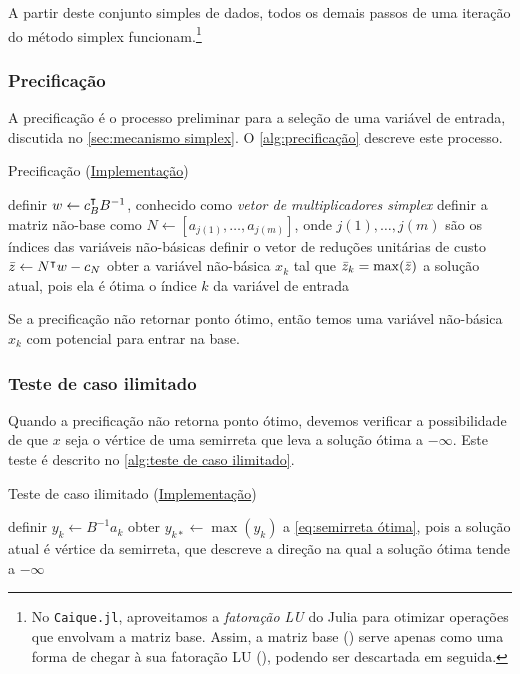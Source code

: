 A partir deste conjunto simples de dados, todos os demais passos de uma iteração do método simplex funcionam.\footnote{No \texttt{Caique.jl}, aproveitamos a \emph{fatoração LU} \cite{UFRGS:LU} do Julia para otimizar operações que envolvam a matriz base. Assim, a matriz base () serve apenas como uma forma de chegar à sua fatoração LU (), podendo ser descartada em seguida.}

\subsubsection*{Precificação}
A precificação é o processo preliminar para a seleção de uma variável de entrada, discutida no \cref{sec:mecanismo simplex}. O \cref{alg:precificação} descreve este processo.

\begin{algorithm}
\begin{algorithmic}[1]
    \caption{Precificação (\href{https://github.com/phcentenaro7/Caique.jl/blob/9c78027f1884181846a6321a5640f92c9a718ce4/src/Simplex.jl\#L88}{Implementação})}\label{alg:precificação}
    \State definir $ w \gets  c_B^\intercal B^{-1}$, conhecido como \emph{vetor de multiplicadores simplex}
    \State definir a matriz não-base como $ N \gets [a_{j(1)}, \ldots, a_{j(m)}]$, onde $j(1), \ldots, j(m)$ são os índices das variáveis não-básicas
    \State definir o vetor de reduções unitárias de custo $\bar{ z} \gets  N^\intercal w - c_N$
    \State obter a variável não-básica $ x_k$ tal que $\bar{z}_{k} = \max(\bar{ z})$
        \State \Return a solução atual, pois ela é ótima
    \EndIf
    \State \Return o índice $k$ da variável de entrada
\end{algorithmic}
\end{algorithm}

Se a precificação não retornar ponto ótimo, então temos uma variável não-básica $ x_k$ com potencial para entrar na base.

\subsubsection*{Teste de caso ilimitado}
Quando a precificação não retorna ponto ótimo, devemos verificar a possibilidade de que $ x$ seja o vértice de uma semirreta que leva a solução ótima a $-\infty$. Este teste é descrito no \cref{alg:teste de caso ilimitado}.

\begin{algorithm}
\begin{algorithmic}[1]
    \caption{Teste de caso ilimitado (\href{https://github.com/phcentenaro7/Caique.jl/blob/9c78027f1884181846a6321a5640f92c9a718ce4/src/Simplex.jl\#L127}{Implementação})}\label{alg:teste de caso ilimitado}
    \State definir $ y_k \gets B^{-1}a_k$
    \State obter $y_{k*} \gets \max( y_k)$
        \State \Return a \cref{eq:semirreta ótima}, pois a solução atual é vértice da semirreta, que descreve a direção na qual a solução ótima tende a $-\infty$
    \EndIf
\end{algorithmic}
\end{algorithm}

